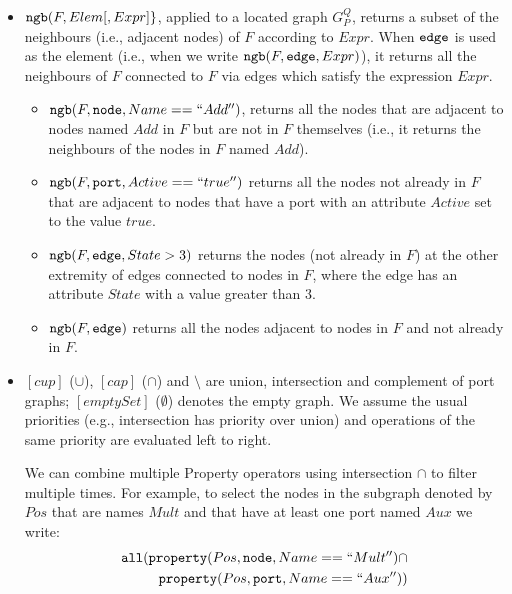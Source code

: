 \documentclass[a4paper,10pt,runningheads]{llncs}
\newcommand{\all}[1]{{\tt all(}#1{\tt )}}
\newcommand{\Node}{{\tt node}}
\newcommand{\Edge}{{\tt edge}}
\newcommand{\Port}{{\tt port}}
\newcommand{\Property}[3]{{\tt property(}#1, #2, #3{\tt )}}
\newcommand{\Ngb}[3]{{\tt ngb(}#1, #2, #3{\tt )}}
\newcommand{\Ngbopt}[2]{{\tt ngb(}#1, #2{\tt )}}
\begin{document}
\begin{itemize}
\begin{itemize}
\begin{itemize}
\end{itemize}
  
\item 
${\tt ngb(}F, Elem [, Expr]{\tt \}}$, applied to a located graph
  $G_P^Q$, returns a subset of the neighbours (i.e., adjacent
  nodes) of $F$ according to $Expr$.  When $\Edge$ is used as the element (i.e.,
  when we write $\Ngb{F}{\Edge}{Expr}$), it returns all the
  neighbours of $F$ connected to $F$ via edges which satisfy the
  expression $Expr$.

\begin{itemize}
   \item $\Ngb{F}{\Node}{Name == ``Add''}$, returns all the nodes
     that are adjacent to nodes named $Add$ in $F$ but are not in
     $F$ themselves (i.e., it returns the neighbours of the nodes in
     $F$ named $Add$).


   \item $\Ngb{F}{\Port}{Active == ``true''}$ returns all the nodes
     not already in $F$ that are adjacent to nodes that have a port
     with an attribute  $Active$ set to the value $true$.
  
 \item $\Ngb{F}{\Edge}{State > 3}$ returns the nodes (not already
   in $F$) at the other extremity of edges connected to nodes in $F$,
   where the edge has an attribute $State$ with a value greater than
   $3$.
 
 \item $\Ngbopt{F}{\Edge}$ returns all the nodes adjacent to
   nodes in $F$ and not already in $F$.
\end{itemize}


\item $[cup]$ ($\cup$),  $[cap]$ ($\cap$) and $\setminus$ are union, intersection and
  complement of port graphs; $[emptySet]$ ($\emptyset$) denotes the empty graph.
We assume the usual priorities (e.g., intersection has priority over union) and operations of the same priority are evaluated left to right.

We can combine multiple \textsf{Property} operators using intersection
$\cap$ to filter multiple times.  
For example, to select the nodes in the subgraph denoted
by $Pos$ that are names $Mult$ and that have at least one port named
$Aux$ we write:
\begin{equation*}
 \begin{split}
\all{\Property{Pos}{\Node}{Name == ``Mult''} \cap \\
\Property{Pos}{\Port}{Name == ``Aux''}}  
 \end{split}
\end{equation*}


\end{itemize}
\end{itemize}
\end{document}
